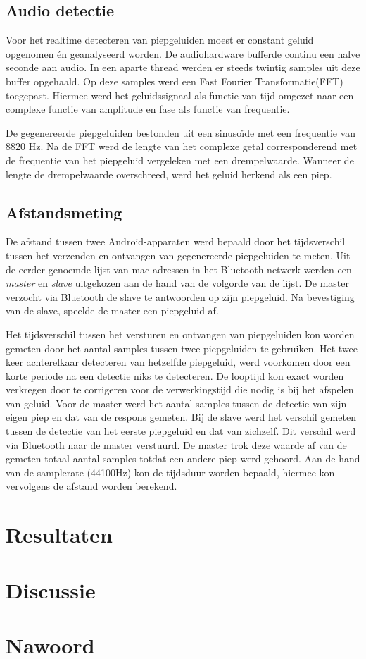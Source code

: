 \documentclass[12pt]{article}
\begin{document}
\subsection{Audio detectie}
Voor het realtime detecteren van piepgeluiden moest er constant geluid opgenomen \'en geanalyseerd worden. De audiohardware bufferde continu een halve seconde aan audio. In een aparte thread werden er steeds twintig samples uit deze buffer opgehaald. Op deze samples werd een Fast Fourier Transformatie(FFT) \cite{bracewell1986fourier} toegepast. Hiermee werd het geluidssignaal als functie van tijd omgezet naar een complexe functie van amplitude en fase als functie van frequentie. 

De gegenereerde piepgeluiden bestonden uit een sinuso\"ide met een frequentie van $8820$ Hz. Na de FFT werd de lengte van het complexe getal corresponderend met de frequentie van het piepgeluid vergeleken met een drempelwaarde. Wanneer de lengte de drempelwaarde overschreed, werd het geluid herkend als een piep.

\subsection{Afstandsmeting}
De afstand tussen twee Android-apparaten werd bepaald door het tijdsverschil tussen het verzenden en ontvangen van gegenereerde piepgeluiden te meten. Uit de eerder genoemde lijst van mac-adressen in het Bluetooth-netwerk werden een \textit{master} en \textit{slave} uitgekozen aan de hand van de volgorde van de lijst. De master verzocht via Bluetooth de slave te antwoorden op zijn piepgeluid. Na bevestiging van de slave, speelde de master een piepgeluid af.

Het tijdsverschil tussen het versturen en ontvangen van piepgeluiden kon worden gemeten door het aantal samples tussen twee piepgeluiden te gebruiken. Het twee keer achterelkaar detecteren van hetzelfde piepgeluid, werd voorkomen door een korte periode na een detectie niks te detecteren. De looptijd kon exact worden verkregen door te corrigeren voor de verwerkingstijd die nodig is bij het afspelen van geluid. Voor de master werd het aantal samples tussen de detectie van zijn eigen piep en dat van de respons gemeten. Bij de slave werd het verschil gemeten tussen de detectie van het eerste piepgeluid en dat van zichzelf. Dit verschil werd via Bluetooth naar de master verstuurd. De master trok deze waarde af van de gemeten totaal aantal samples totdat een andere piep werd gehoord. Aan de hand van de samplerate (44100Hz) kon de tijdsduur worden bepaald, hiermee kon vervolgens de afstand worden berekend.

\section{Resultaten}
\label{sec:resultaten}

\section{Discussie}
\label{sec:discussie}

\section{Nawoord}
\label{sec:nawoord}



\end{document}
